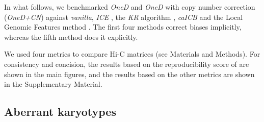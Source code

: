 \documentclass[a4,center,fleqn]{NAR}
\begin{document}
In what follows, we benchmarked \textit{OneD} and \textit{OneD} with copy
number correction (\textit{OneD+CN}) against \textit{vanilla},
\textit{ICE} \citep{imakaev2012iterative}, the \textit{KR} algorithm
\citep{knight2013fast}, \textit{caICB} \citep{wu2016computational} and the
Local Genomic Features method \citep[\textit{LGF},][]{hu2012hicnorm,
servant2012hitc}. The first four methods correct biases implicitly,
whereas the fifth method does it explicitly.

We used four metrics to compare Hi-C matrices (see Materials and Methods).
For consistency and concision, the results based on the reproducibility
score of \citet{yan2017hicspector} are shown in the main figures, and the
results based on the other metrics are shown in the Supplementary
Material.


%
%
%



\subsection{Aberrant karyotypes}
\end{document}
